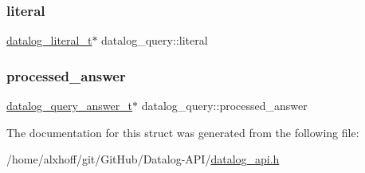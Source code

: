 \mbox{\label{structdatalog__query_ae91a9dea687ce035816c38593d171e75}} 
\subsubsection{\texorpdfstring{literal}{literal}}
{\footnotesize\ttfamily \hyperlink{datalog__api_8h_aeb86f46db4f8142eeb397d20f69f6487}{datalog\+\_\+literal\+\_\+t}$\ast$ datalog\+\_\+query\+::literal}

\mbox{\label{structdatalog__query_a54e2eef2c18bc5e4c0f0a6c10f1e6397}} 
\subsubsection{\texorpdfstring{processed\+\_\+answer}{processed\_answer}}
{\footnotesize\ttfamily \hyperlink{datalog__api_8h_a34c189d3b3a5d5821691c8237e3922e6}{datalog\+\_\+query\+\_\+answer\+\_\+t}$\ast$ datalog\+\_\+query\+::processed\+\_\+answer}



The documentation for this struct was generated from the following file\+:\begin{DoxyCompactItemize}
\item 
/home/alxhoff/git/\+Git\+Hub/\+Datalog-\/\+A\+P\+I/\hyperlink{datalog__api_8h}{datalog\+\_\+api.\+h}\end{DoxyCompactItemize}
